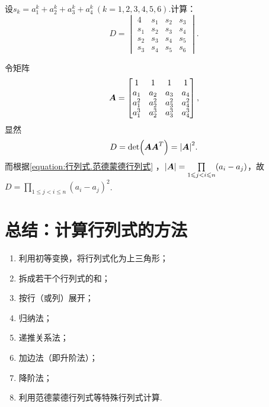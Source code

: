 \begin{example}
设\(s_k = a_1^k + a_2^k + a_3^k + a_4^k\ (k=1,2,3,4,5,6)\).计算：\[
D = \begin{vmatrix}
4 & s_1 & s_2 & s_3 \\
s_1 & s_2 & s_3 & s_4 \\
s_2 & s_3 & s_4 & s_5 \\
s_3 & s_4 & s_5 & s_6
\end{vmatrix}.
\]
\begin{solution}
令矩阵\[
\boldsymbol{A} = \begin{bmatrix}
1 & 1 & 1 & 1 \\
a_1 & a_2 & a_3 & a_4 \\
a_1^2 & a_2^2 & a_3^2 & a_4^2 \\
a_1^3 & a_2^3 & a_3^3 & a_4^3
\end{bmatrix},
\]显然\[
D = \det(\boldsymbol{A}\boldsymbol{A}^T) = \abs{\boldsymbol{A}}^2.
\]而根据\cref{equation:行列式.范德蒙德行列式} ，\(\abs{\boldsymbol{A}} = \prod\limits_{1 \leqslant j < i \leqslant n} (a_i - a_j)\)，故\(D = \prod\limits_{1 \leqslant j < i \leqslant n} (a_i - a_j)^2\).
\end{solution}
\end{example}

\section{总结：计算行列式的方法}
\begin{enumerate}
\item 利用初等变换，将行列式化为上三角形；
\item 拆成若干个行列式的和；
\item 按行（或列）展开；
\item 归纳法；
\item 递推关系法；
\item 加边法（即升阶法）；
\item 降阶法；
\item 利用范德蒙德行列式等特殊行列式计算.
\end{enumerate}
